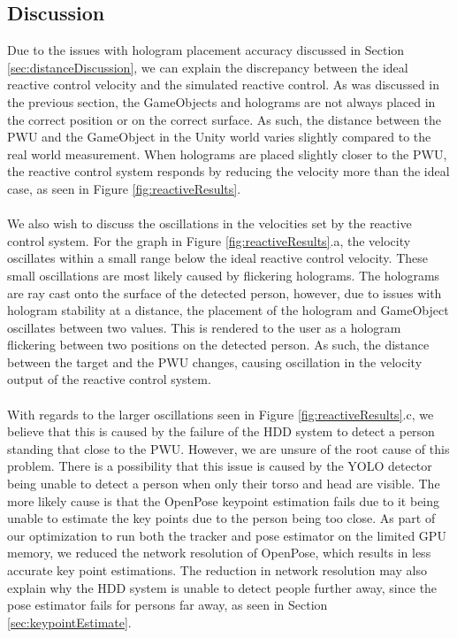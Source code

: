 \newpage

\subsection{Discussion} \label{sec:gazeboDiscussion}
Due to the issues with hologram placement accuracy discussed in Section \ref{sec:distanceDiscussion}, we can explain the discrepancy between the ideal reactive control velocity and the simulated reactive control. As was discussed in the previous section, the GameObjects and holograms are not always placed in the correct position or on the correct surface. As such, the distance between the PWU and the GameObject in the Unity world varies slightly compared to the real world measurement. When holograms are placed slightly closer to the PWU, the reactive control system responds by reducing the velocity more than the ideal case, as seen in Figure \ref{fig:reactiveResults}.

\paragraph{}We also wish to discuss the oscillations in the velocities set by the reactive control system. For the graph in Figure \ref{fig:reactiveResults}.a, the velocity oscillates within a small range below the ideal reactive control velocity. These small oscillations are most likely caused by flickering holograms. The holograms are ray cast onto the surface of the detected person, however, due to issues with hologram stability at a distance, the placement of the hologram and GameObject oscillates between two values. This is rendered to the user as a hologram flickering between two positions on the detected person. As such, the distance between the target and the PWU changes, causing oscillation in the velocity output of the reactive control system. 

\paragraph{}With regards to the larger oscillations seen in Figure \ref{fig:reactiveResults}.c, we believe that this is caused by the failure of the HDD system to detect a person standing that close to the PWU. However, we are unsure of the root cause of this problem. There is a possibility that this issue is caused by the YOLO detector being unable to detect a person when only their torso and head are visible. The more likely cause is that the OpenPose keypoint estimation fails due to it being unable to estimate the key points due to the person being too close. As part of our optimization to run both the tracker and pose estimator on the limited GPU memory, we reduced the network resolution of OpenPose, which results in less accurate key point estimations. The reduction in network resolution may also explain why the HDD system is unable to detect people further away, since the pose estimator fails for persons far away, as seen in Section \ref{sec:keypointEstimate}.

